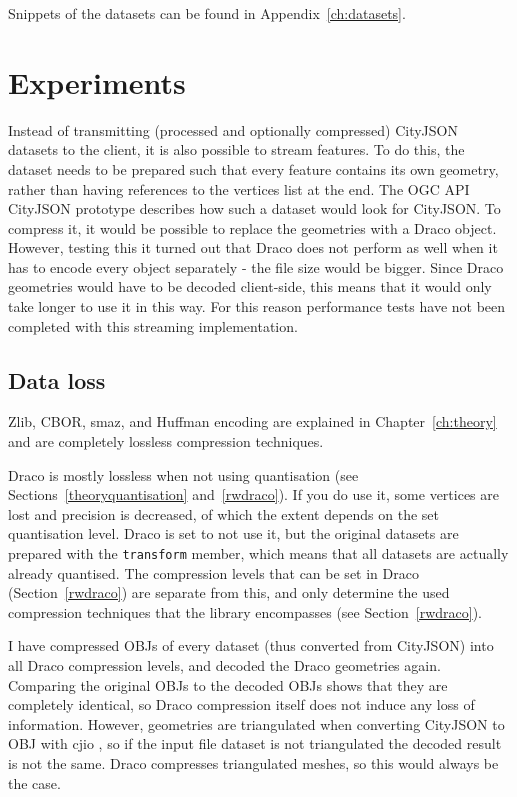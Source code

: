 Snippets of the datasets can be found in Appendix~\ref{ch:datasets}.



\section{Experiments}
\label{sec:experiments}
Instead of transmitting (processed and optionally compressed) CityJSON datasets to the client, it is also possible to stream features.
To do this, the dataset needs to be prepared such that every feature contains its own geometry, rather than having references to the vertices list at the end.
The OGC API CityJSON prototype describes how such a dataset would look for CityJSON.
To compress it, it would be possible to replace the geometries with a Draco object.
However, testing this it turned out that Draco does not perform as well when it has to encode every object separately - the file size would be bigger.
Since Draco geometries would have to be decoded client-side, this means that it would only take longer to use it in this way.
For this reason performance tests have not been completed with this streaming implementation.

\subsection{Data loss}
\label{lossiness}

Zlib, CBOR, smaz, and Huffman encoding are explained in Chapter~\ref{ch:theory} and are completely lossless compression techniques.

Draco is mostly lossless when not using quantisation (see Sections~\ref{theoryquantisation} and~\ref{rwdraco}).
If you do use it, some vertices are lost and precision is decreased, of which the extent depends on the set quantisation level.
Draco is set to not use it, but the original datasets are prepared with the \texttt{transform} member, which means that all datasets are actually already quantised.
The compression levels that can be set in Draco (Section~\ref{rwdraco}) are separate from this, and only determine the used compression techniques that the library encompasses (see Section~\ref{rwdraco}).

I have compressed OBJs of every dataset (thus converted from CityJSON) into all Draco compression levels, and decoded the Draco geometries again.
Comparing the original OBJs to the decoded OBJs shows that they are completely identical, so Draco compression itself does not induce any loss of information.
However, geometries are triangulated when converting CityJSON to OBJ with cjio \citep{cjio}, so if the input file dataset is not triangulated the decoded result is not the same.
Draco compresses triangulated meshes, so this would always be the case.

